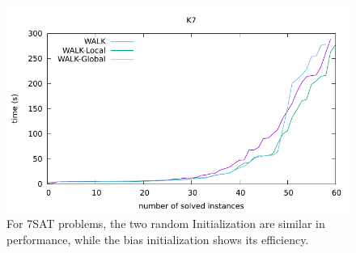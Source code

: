 \documentclass[12pt,a4paper,twoside]{scrartcl}
\numberwithin{equation}{section}
\begin{document}
  \begin{figure}[H]
\begin{center}
  \includegraphics[scale = 1]{DATA/K7/e3w.pdf}
  \end{center}
  \caption{For 7SAT problems, the two random Initialization are similar in performance, while the bias initialization shows its efficiency.}
  \label{Experiment 3 k7-w cactus plot}
  \end{figure}
\end{document}
